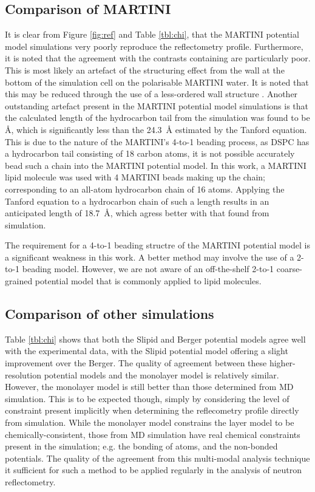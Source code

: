 \documentclass[amsmath,amssymb,twocolumn,superscriptaddress,aps,prl]{revtex4-1}
\begin{document}
\subsection{Comparison of MARTINI}
It is clear from Figure \ref{fig:ref} and Table \ref{tbl:chi}, that the MARTINI potential model simulations very poorly reproduce the reflectometry profile.
Furthermore, it is noted that the agreement with the contrasts containing  are particularly poor.
This is most likely an artefact of the structuring effect from the wall at the bottom of the simulation cell on the polarisable MARTINI water.
It is noted that this may be reduced through the use of a less-ordered wall structure \cite{Koutsioubas2016}.
Another outstanding artefact present in the MARTINI potential model simulations is that the calculated length of the hydrocarbon tail from the simulation was found to be \si{\angstrom}, which is significantly less than the \SI{24.3}{\angstrom} estimated by the Tanford equation.
This is due to the nature of the MARTINI's 4-to-1 beading process, as DSPC has a hydrocarbon tail consisting of 18 carbon atoms, it is not possible accurately bead such a chain into the MARTINI potential model.
In this work, a MARTINI lipid molecule was used with 4 MARTINI beads making up the chain; corresponding to an all-atom hydrocarbon chain of 16 atoms.
Applying the Tanford equation to a hydrocarbon chain of such a length results in an anticipated length of \SI{18.7}{\angstrom}, which agress better with that found from simulation.

The requirement for a 4-to-1 beading structre of the MARTINI potential model is a significant weakness in this work.
A better method may involve the use of a 2-to-1 beading model.
However, we are not aware of an off-the-shelf 2-to-1 coarse-grained potential model that is commonly applied to lipid molecules.

\subsection{Comparison of other simulations}
Table \ref{tbl:chi} shows that both the Slipid and Berger potential models agree well with the experimental data, with the Slipid potential model offering a slight improvement over the Berger.
The quality of agreement between these higher-resolution potential models and the monolayer model is relatively similar.
However, the monolayer model is still better than those determined from MD simulation.
This is to be expected though, simply by considering the level of constraint present implicitly when determining the reflecometry profile directly from simulation.
While the monolayer model constrains the layer model to be chemically-consistent, those from MD simulation have real chemical constraints present in the simulation; e.g. the bonding of atoms, and the non-bonded potentials.
The quality of the agreement from this multi-modal analysis technique it sufficient for such a method to be applied regularly in the analysis of neutron reflectometry.
\end{document}

